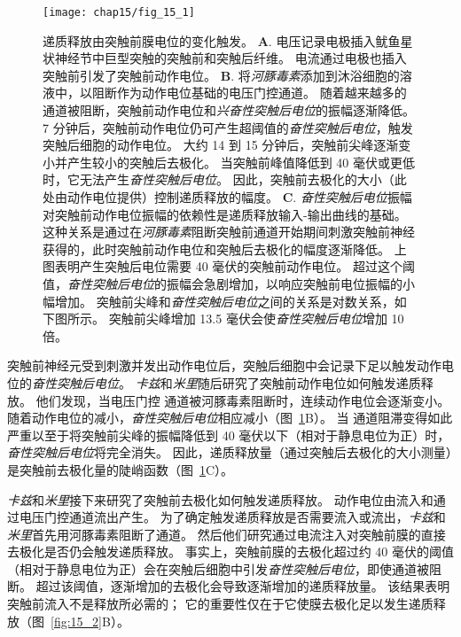 \begin{figure}[htbp]
	\centering
	\texttt{[image: chap15/fig\_15\_1]}
	\caption{递质释放由突触前膜电位的变化触发\cite{katz1967study}。
	\textbf{A}. 电压记录电极插入鱿鱼星状神经节中巨型突触的突触前和突触后纤维。
	电流通过电极也插入突触前引发了突触前动作电位。
	\textbf{B}. 将\textit{河豚毒素}添加到沐浴细胞的溶液中，以阻断作为动作电位基础的电压门控通道。
	随着越来越多的通道被阻断，突触前动作电位和\textit{兴奋性突触后电位}的振幅逐渐降低。
	7 分钟后，突触前动作电位仍可产生超阈值的\textit{奋性突触后电位}，触发突触后细胞的动作电位。
	大约 14 到 15 分钟后，突触前尖峰逐渐变小并产生较小的突触后去极化。
	当突触前峰值降低到 40 毫伏或更低时，它无法产生\textit{奋性突触后电位}。
	因此，突触前去极化的大小（此处由动作电位提供）控制递质释放的幅度。
	\textbf{C}. \textit{奋性突触后电位}振幅对突触前动作电位振幅的依赖性是递质释放输入-输出曲线的基础。
	这种关系是通过在\textit{河豚毒素}阻断突触前通道开始期间刺激突触前神经获得的，此时突触前动作电位和突触后去极化的幅度逐渐降低。
	上图表明产生突触后电位需要 40 毫伏的突触前动作电位。
	超过这个阈值，\textit{奋性突触后电位}的振幅会急剧增加，以响应突触前电位振幅的小幅增加。
	突触前尖峰和\textit{奋性突触后电位}之间的关系是对数关系，如下图所示。
	突触前尖峰增加 13.5 毫伏会使\textit{奋性突触后电位}增加 10 倍。}
	\label{fig:15_1}
\end{figure}
突触前神经元受到刺激并发出动作电位后，突触后细胞中会记录下足以触发动作电位的\textit{奋性突触后电位}。
\textit{卡兹}和\textit{米里}随后研究了突触前动作电位如何触发递质释放。
他们发现，当电压门控  通道被河豚毒素阻断时，连续动作电位会逐渐变小。
随着动作电位的减小，\textit{奋性突触后电位}相应减小（图~\ref{fig:15_1}B）。
当  通道阻滞变得如此严重以至于将突触前尖峰的振幅降低到 40 毫伏以下（相对于静息电位为正）时，\textit{奋性突触后电位}将完全消失。
因此，递质释放量（通过突触后去极化的大小测量）是突触前去极化量的陡峭函数（图~\ref{fig:15_1}C）。


\textit{卡兹}和\textit{米里}接下来研究了突触前去极化如何触发递质释放。
动作电位由流入和通过电压门控通道流出产生。
为了确定触发递质释放是否需要流入或流出，\textit{卡兹}和\textit{米里}首先用河豚毒素阻断了通道。
然后他们研究通过电流注入对突触前膜的直接去极化是否仍会触发递质释放。
事实上，突触前膜的去极化超过约 40 毫伏的阈值（相对于静息电位为正）会在突触后细胞中引发\textit{奋性突触后电位}，即使通道被阻断。
超过该阈值，逐渐增加的去极化会导致逐渐增加的递质释放量。
该结果表明突触前流入不是释放所必需的；
它的重要性仅在于它使膜去极化足以发生递质释放（图~\ref{fig:15_2}B）。


